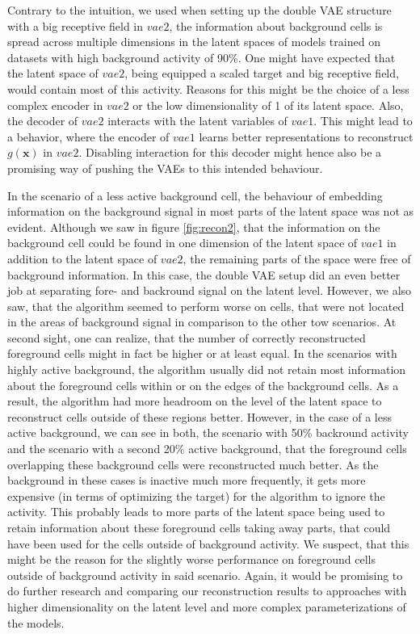 \documentclass[12pt]{report}
\theoremstyle{definition}
\begin{document}
Contrary to the intuition, we used when setting up the double VAE structure with a big receptive field in $vae2$, the information about background cells is spread across multiple dimensions in the latent spaces of models trained on datasets with high background activity of 90\%. One might have expected that the latent space of $vae2$, being equipped a scaled target and big receptive field, would contain most of this activity. Reasons for this might be the choice of a less complex encoder in $vae2$ or the low dimensionality of 1 of its latent space. Also, the decoder of $vae2$ interacts with the latent variables of $vae1$. This might lead to a behavior, where the encoder of $vae1$ learns better representations to reconstruct $g(\mathbf{x})$ in $vae2$. Disabling interaction for this decoder might hence also be a promising way of pushing the VAEs to this intended behaviour.

In the scenario of a less active background cell, the behaviour of embedding information on the background signal in most parts of the latent space was not as evident. Although we saw in figure \ref{fig:recon2}, that the information on the background cell could be found in one dimension of the latent space of $vae1$ in addition to the latent space of $vae2$, the remaining parts of the space were free of background information. In this case, the double VAE setup did an even better job at separating fore- and backround signal on the latent level. However, we also saw, that the algorithm seemed to perform worse on cells, that were not located in the areas of background signal in comparison to the other tow scenarios. At second sight, one can realize, that the number of correctly reconstructed foreground cells might in fact be higher or at least equal. In the scenarios with highly active background, the algorithm usually did not retain most information about the foreground cells within or on the edges of the background cells. As a result, the algorithm had more headroom on the level of the latent space to reconstruct cells outside of these regions better. However, in the case of a less active background, we can see in both, the scenario with 50\% backround activity and the scenario with a second 20\% active background, that the foreground cells overlapping these background cells were reconstructed much better. As the background in these cases is inactive much more frequently, it gets more expensive (in terms of optimizing the target) for the algorithm to ignore the activity. This probably leads to more parts of the latent space being used to retain information about these foreground cells taking away parts, that could have been used for the cells outside of background activity. We suspect, that this might be the reason for the slightly worse performance on foreground cells outside of background activity in said scenario. Again, it would be promising to do further research and comparing our reconstruction results to approaches with higher dimensionality on the latent level and more complex parameterizations of the models. 
\end{document}
